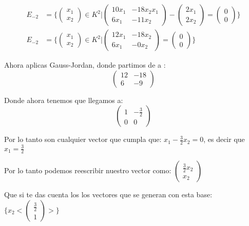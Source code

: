 \documentclass[12pt]{report}                                %
\begin{document}
\begin{equation*}
\begin{split}
                E_{-2} &= \{ \begin{pmatrix}x_1\\x_2\end{pmatrix} \in K^2 |
                \begin{pmatrix}10x_1&-18x_2x_1\\6x_1&-11x_2\end{pmatrix}  - \begin{pmatrix}2x_1\\2x_2\end{pmatrix} 
                = \begin{pmatrix}0\\0\end{pmatrix} \} \\
                E_{-2} &= \{ \begin{pmatrix}x_1\\x_2\end{pmatrix} \in K^2 |
                \begin{pmatrix}12x_1&-18x_2\\6x_1&-0x_2\end{pmatrix}
                = \begin{pmatrix}0\\0\end{pmatrix} \}
            \end{split}
            \end{equation*}


            Ahora aplicas Gauss-Jordan, donde partimos de a :
            $$\begin{pmatrix}12 & -18 \\6 & -9\end{pmatrix}$$

            Donde ahora tenemos que llegamos a:
            $$\begin{pmatrix}1 & -\frac{3}{2} \\ 0 & 0\end{pmatrix}$$

            Por lo tanto son cualquier vector que cumpla que:
            $x_1 -\frac{3}{2}x_2 = 0$, es decir que $x_1 = \frac{3}{2}$
            
            Por lo tanto podemos reescribir nuestro vector como:
            $\begin{pmatrix} \frac{3}{2}x_2 \\ x_2\end{pmatrix}$

            Que si te das cuenta los los vectores que se generan con esta base:
            $ \{ x_2 <\begin{pmatrix}\frac{3}{2} \\ 1\end{pmatrix}> \}$
            
\end{document}
